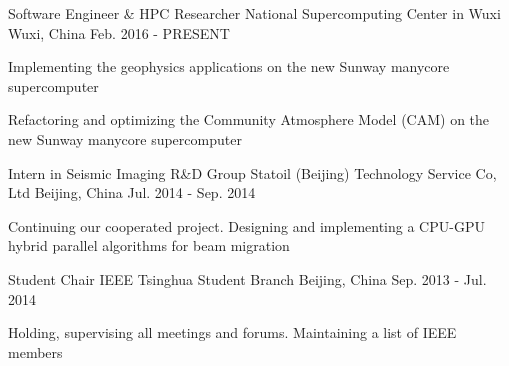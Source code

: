 \documentclass[11pt, a4paper]{awesome-cv}
\begin{document}
\begin{cventries}

  \cventry
    {Software Engineer \& HPC Researcher} %
    {National Supercomputing Center in Wuxi} %
    {Wuxi, China} %
    {Feb. 2016 - PRESENT} %
    {
      \begin{cvitems} %
        \item {Implementing the geophysics applications on the new Sunway manycore supercomputer}
        \item {Refactoring and optimizing the Community Atmosphere Model (CAM) on the new Sunway manycore supercomputer}
      \end{cvitems}
    }

  \cventry
    {Intern in Seismic Imaging R\&D Group} %
    {Statoil (Beijing) Technology Service Co, Ltd} %
    {Beijing, China} %
    {Jul. 2014 - Sep. 2014} %
    {
      \begin{cvitems} %
        \item {Continuing our cooperated project. Designing and implementing a CPU-GPU hybrid parallel algorithms for beam migration}
      \end{cvitems}
    }

  \cventry
    {Student Chair} %
    {IEEE Tsinghua Student Branch} %
    {Beijing, China} %
    {Sep. 2013 - Jul. 2014} %
    {
      \begin{cvitems} %
        \item {Holding, supervising all meetings and forums. Maintaining a list of IEEE members}
      \end{cvitems}
    }

\end{cventries}

\end{document}
